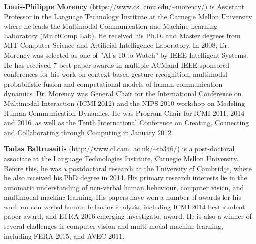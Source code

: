 \begin{bio}
  {\bfseries Louis-Philippe Morency} (\url{https://www.cs. cmu.edu/~morency/}) is Assistant Professor in the Language Technology Institute at the Carnegie Mellon University where he leads the Multimodal Communication and Machine Learning Laboratory (MultiComp Lab). He received his Ph.D. and Master degrees from MIT Computer Science and Artificial Intelligence Laboratory. In 2008, Dr. Morency was selected as one of ”AI’s 10 to Watch” by IEEE Intelligent Systems. He has received 7 best paper awards in multiple ACMand IEEE-sponsored conferences for his work on context-based gesture recognition, multimodal probabilistic fusion and computational models of human communication dynamics. Dr. Morency was General Chair for the International Conference on Multimodal Interaction (ICMI 2012) and the NIPS 2010 workshop on Modeling Human Communication Dynamics. He was Program Chair for ICMI 2011, 2014 and 2016, as well as the Tenth International Conference on Creating, Connecting and Collaborating through Computing in January 2012.
 
  {\bfseries Tadas Baltrusaitis} (\url{http://www.cl.cam. ac.uk/~tb346/}) is a post-doctoral associate at the Language Technologies Institute, Carnegie Mellon University. Before this, he was a postdoctoral research at the University of Cambridge, where he also received his PhD degree in 2014. His primary research interests lie in the automatic understanding of non-verbal human behaviour, computer vision, and multimodal machine learning. His papers have won a number of awards for his work on non-verbal human behavior analysis, including ICMI 2014 best student paper award, and ETRA 2016 emerging investigator award. He is also a winner of several challenges in computer vision and multi-modal machine learning, including FERA 2015, and AVEC 2011.
\end{bio}

